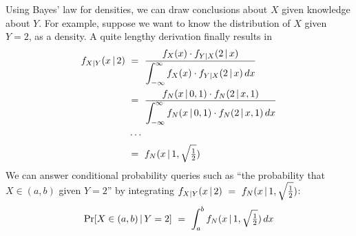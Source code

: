 Using Bayes' law for densities, we can draw conclusions about $X$ given knowledge about $Y$.
For example, suppose we want to know the distribution of $X$ given $Y = 2$, as a density.
A quite lengthy derivation finally results in
\begin{equation}
\begin{aligned}
	f_{X|Y}(x \given 2)&\ =\ \frac{f_{X}(x) \cdot f_{Y|X}(2 \given x)}{\displaystyle\int_{-\infty}^{\infty} f_{X}(x) \cdot f_{Y|X}(2 \given x)\,dx}
\\
	&\ =\ \frac{f_N(x \given 0,1) \cdot f_N(2 \given x,1)}{\displaystyle\int_{-\infty}^{\infty}
	f_N(x \given 0,1) \cdot f_N(2 \given x,1)\,dx}
\\
	&\,\,\cdots\ 
\\
	&\ =\ f_N(x \given 1, \sqrt{\tfrac{1}{2}})
\end{aligned}
\end{equation}
We can answer conditional probability queries such as ``the probability that $X \in (a,b)$ given $Y = 2$'' by integrating $f_{X|Y}(x \,|\, 2)\ =\ f_N(x \,|\, 1, \sqrt{\tfrac{1}{2}})$:
\begin{equation}
	\mathrm{Pr}\!\left[{X \in (a,b) \,|\, Y = 2}\right]\ =\ \int_a^b f_N(x \,|\, 1, \sqrt{\tfrac{1}{2}})\,dx
\end{equation}

